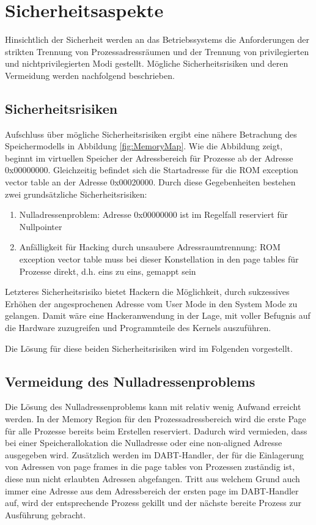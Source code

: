 \section{Sicherheitsaspekte}

Hinsichtlich der Sicherheit werden an das Betriebssystems die Anforderungen der strikten Trennung von Prozessadressräumen und der Trennung von privilegierten und nichtprivilegierten Modi gestellt. Mögliche Sicherheitsrisiken und deren Vermeidung werden nachfolgend beschrieben.

 

\subsection{Sicherheitsrisiken}

Aufschluss über mögliche Sicherheitsrisiken ergibt eine nähere Betrachung des Speichermodells in Abbildung \ref{fig:MemoryMap}. Wie die Abbildung zeigt, beginnt im virtuellen Speicher der Adressbereich für Prozesse ab der Adresse 0x00000000. Gleichzeitig befindet sich die Startadresse für die ROM exception vector table an der Adresse 0x00020000. Durch diese Gegebenheiten bestehen zwei grundsätzliche Sicherheitsrisiken:

\begin{enumerate}
	\item Nulladressenproblem: Adresse 0x00000000 ist im Regelfall reserviert für Nullpointer
	\item Anfälligkeit für Hacking durch unsaubere Adressraumtrennung: ROM exception vector table muss bei dieser Konstellation in den page tables für Prozesse direkt, d.h. eins zu eins, gemappt sein
\end{enumerate}

Letzteres Sicherheitsrisiko bietet Hackern die Möglichkeit, durch sukzessives Erhöhen der angesprochenen Adresse vom User Mode in den System Mode zu gelangen. Damit wäre eine Hackeranwendung in der Lage, mit voller Befugnis auf die Hardware zuzugreifen und Programmteile des Kernels auszuführen.

Die Lösung für diese beiden Sicherheitsrisiken wird im Folgenden vorgestellt.

\subsection{Vermeidung des Nulladressenproblems}

Die Lösung des Nulladressenproblems kann mit relativ wenig Aufwand erreicht werden. In der Memory Region für den Prozessadressbereich wird die erste Page für alle Prozesse bereits beim Erstellen reserviert. Dadurch wird vermieden, dass bei einer Speicherallokation die Nulladresse oder eine non-aligned Adresse ausgegeben wird. Zusätzlich werden im DABT-Handler, der für die Einlagerung von Adressen von page frames in die page tables von Prozessen zuständig ist, diese nun nicht erlaubten Adressen abgefangen. Tritt aus welchem Grund auch immer eine Adresse aus dem Adressbereich der ersten page im DABT-Handler auf, wird der entsprechende Prozess gekillt und der nächste bereite Prozess zur Ausführung gebracht.

